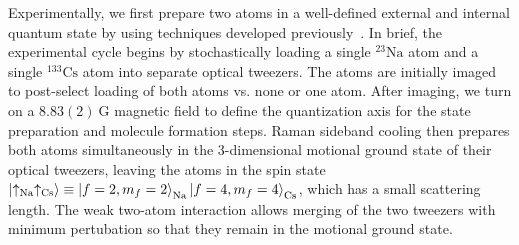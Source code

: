\documentclass[aps,prl,twocolumn,10pt,superscriptaddress]{revtex4-1}
\newcommand{\Na}{\mathrm{Na}}
\newcommand{\Cs}{\mathrm{Cs}}
\begin{document}
Experimentally, we first prepare two atoms in a well-defined external and internal quantum state
by using techniques developed previously~\cite{Liu2018, Liu2019, Wang2019}.
In brief, the experimental cycle begins by stochastically loading a single ${}^{23}\Na$ atom
and a single ${}^{133}\Cs$ atom into separate optical tweezers.
The atoms are initially imaged to post-select loading of both atoms vs.
none or one atom.
After imaging, we turn on a $8.83(2)~\mathrm{G}$ magnetic field to define the quantization axis
for the state preparation and molecule formation steps.
Raman sideband cooling then prepares both atoms simultaneously
in the 3-dimensional motional ground state of their optical tweezers, leaving the atoms in the spin state~$\ket{\uparrow_{\Na}\uparrow_{\Cs}}\equiv \ket{f=2,m_f=2}_{\Na}\ket{f=4,m_f=4}_{\Cs}$,
which has a small scattering length.
The weak two-atom interaction allows merging of the two tweezers with minimum pertubation so that they remain in the motional ground state.
\end{document}
